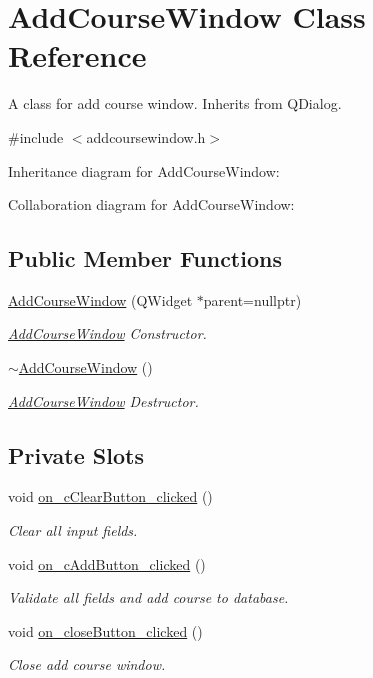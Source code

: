 \hypertarget{class_add_course_window}{}\section{Add\+Course\+Window Class Reference}
\label{class_add_course_window}


A class for add course window. Inherits from Q\+Dialog.  




{\ttfamily \#include $<$addcoursewindow.\+h$>$}



Inheritance diagram for Add\+Course\+Window\+:


Collaboration diagram for Add\+Course\+Window\+:
\subsection*{Public Member Functions}
\begin{DoxyCompactItemize}
\item 
\hyperlink{class_add_course_window_a819c3f448d2e1cab1f2a71e6aa58b3f1}{Add\+Course\+Window} (Q\+Widget $\ast$parent=nullptr)
\begin{DoxyCompactList}\small\item\em \hyperlink{class_add_course_window}{Add\+Course\+Window} Constructor. \end{DoxyCompactList}\item 
\hyperlink{class_add_course_window_a6c12939c92368dd15b82c6536ce8bd26}{$\sim$\+Add\+Course\+Window} ()
\begin{DoxyCompactList}\small\item\em \hyperlink{class_add_course_window}{Add\+Course\+Window} Destructor. \end{DoxyCompactList}\end{DoxyCompactItemize}
\subsection*{Private Slots}
\begin{DoxyCompactItemize}
\item 
void \hyperlink{class_add_course_window_afa9c1e66303b4ba61231ca3f23c54c07}{on\+\_\+c\+Clear\+Button\+\_\+clicked} ()
\begin{DoxyCompactList}\small\item\em Clear all input fields. \end{DoxyCompactList}\item 
void \hyperlink{class_add_course_window_a6352af0f6a82eb9b773cdf5c535bbcc5}{on\+\_\+c\+Add\+Button\+\_\+clicked} ()
\begin{DoxyCompactList}\small\item\em Validate all fields and add course to database. \end{DoxyCompactList}\item 
void \hyperlink{class_add_course_window_ab01f953053c365346d8a11ecdd8db94b}{on\+\_\+close\+Button\+\_\+clicked} ()
\begin{DoxyCompactList}\small\item\em Close add course window. \end{DoxyCompactList}\end{DoxyCompactItemize}
